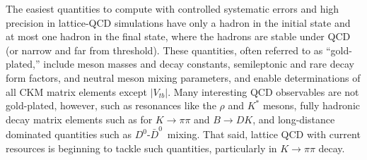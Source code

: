 The easiest quantities to compute with controlled systematic errors and high precision in lattice-QCD
simulations have only a hadron in the initial state and at most one hadron in the final state, where the
hadrons are stable under QCD (or narrow and far from threshold).
These quantities, often referred to as ``gold-plated,'' include meson masses and decay constants,
semileptonic and rare decay form factors, and neutral meson mixing parameters, and enable determinations of
all CKM matrix elements except $|V_{tb}|$.
Many interesting QCD observables are not gold-plated, however, such as resonances like the $\rho$ and $K^*$
mesons, fully hadronic decay matrix elements such as for $K \to \pi\pi$ and $B\to DK$, and long-distance
dominated quantities such as $D^0$-$\bar{D}^0$~mixing.
That said, lattice QCD with current resources is beginning to tackle such quantities, particularly in 
$K\to\pi\pi$ decay.

